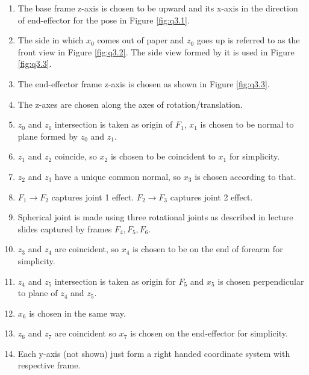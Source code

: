 \documentclass[12pt]{article}
\begin{document}
\begin{enumerate}[nolistsep]
  \item The base frame z-axis is chosen to be upward and its x-axis in the direction of end-effector for the pose in Figure \ref{fig:q3.1}.
  \item The side in which $x_0$ comes out of paper and $z_0$ goes up is referred to as the front view in Figure \ref{fig:q3.2}. The side view formed by it is used in Figure \ref{fig:q3.3}.
  \item The end-effector frame z-axis is chosen as shown in Figure \ref{fig:q3.3}.
  \item The z-axes are chosen along the axes of rotation/translation.
  \item $z_0$ and $z_1$ intersection is taken as origin of $F_1$, $x_1$ is chosen to be normal to plane formed by $z_0$ and $z_1$.
  \item $z_1$ and $z_2$ coincide, so $x_2$ is chosen to be coincident to $x_1$ for simplicity.
  \item $z_2$ and $z_3$ have a unique common normal, so $x_3$ is chosen according to that.
  \item $F_1 \to F_2$ captures joint 1 effect. $F_2 \to F_3$ captures joint 2 effect.
  \item Spherical joint is made using three rotational joints as described in lecture slides captured by frames $F_4, F_5, F_6$.
  \item $z_3$ and $z_4$ are coincident, so $x_4$ is chosen to be on the end of forearm for simplicity.
  \item $z_4$ and $z_5$ intersection is taken as origin for $F_5$ and $x_5$ is chosen perpendicular to plane of $z_4$ and $z_5$.
  \item $x_6$ is chosen in the same way.
  \item $z_6$ and $z_7$ are coincident so $x_7$ is chosen on the end-effector for simplicity.
  \item Each y-axis (not shown) just form a right handed coordinate system with respective frame.
\end{enumerate}
\end{document}
